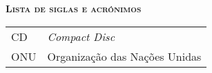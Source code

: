 
\vspace*{45pt}
\begin{flushleft}
	{\Large \textbf{\scshape{Lista de siglas e acrónimos}}}
\end{flushleft}
\vspace*{20pt}

\begin{tabular}{l l}
    CD      &  \textit{Compact Disc}\\
    ONU     &   Organização das Nações Unidas\\
\end{tabular}

